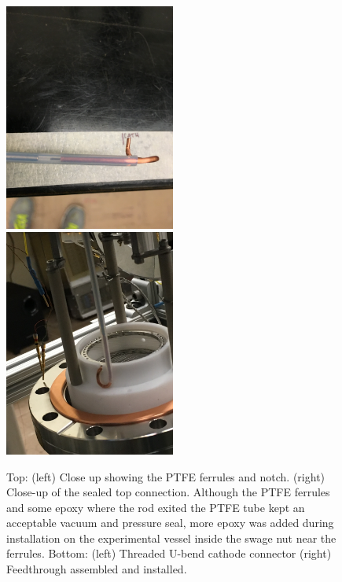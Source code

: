 \begin{figure}[htbp]
\includegraphics[width=0.5\textwidth, angle=-90]{figures/testbed/ft5_3.jpg}
\includegraphics[width=0.5\textwidth, angle=-90]{figures/testbed/ft5_4.jpg}  
\caption{Top: (left) Close up showing the \acs{PTFE} ferrules and notch. (right) Close-up of the sealed top connection. Although the \acs{PTFE} ferrules and some epoxy where the rod exited the \acs{PTFE} tube kept an acceptable vacuum and pressure seal, more epoxy was added during installation on the experimental vessel inside the swage nut near the ferrules. Bottom: (left) Threaded U-bend cathode connector (right) Feedthrough assembled and installed.}
 \label{fig:ssrodft}
\end{figure}


\FloatBarrier
